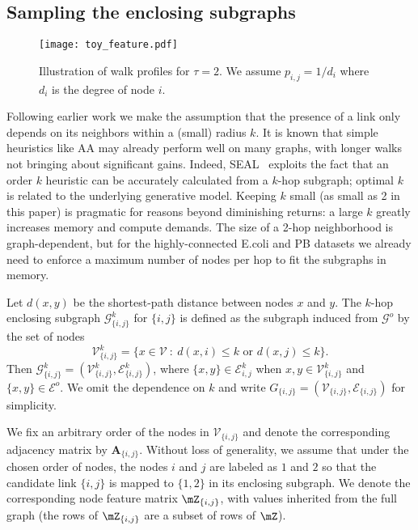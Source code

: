 \documentclass[11pt]{article}
\begin{document}
\vspace{-2mm}
\subsection{Sampling the enclosing subgraphs}
\begin{wrapfigure}{l}{0.6\textwidth} 
\centering
\vspace{-4mm}
\texttt{[image: toy\_feature.pdf]}
\caption{Illustration of walk profiles for $\tau=2$. We assume $p_{i,j}=1/d_i$ where $d_i$ is the degree of node $i$.}
\label{fig:features}
\end{wrapfigure}
Following earlier work we make the assumption that the presence of a link only depends on its neighbors within a (small) radius $k$. It is known that simple heuristics like AA may already perform well on many graphs, with longer walks not bringing about significant gains. Indeed, SEAL~\citep{zhang2018link} exploits the fact that an order $k$ heuristic can be accurately calculated from a $k$-hop subgraph; optimal $k$ is related to the underlying generative model. Keeping $k$ small (as small as 2 in this paper) is pragmatic for reasons beyond diminishing returns: a large $k$ greatly increases memory and compute demands. The size of a 2-hop neighborhood is graph-dependent, but for the highly-connected E.coli and PB datasets we already need to enforce a maximum number of nodes per hop to fit the subgraphs in memory.

Let $d(x,y)$ be the shortest-path distance between nodes $x$ and $y$. The $k$-hop enclosing subgraph $\mathcal{G}^k_{\{i,j\}}$ for $\{i,j\}$ is defined as the subgraph induced from $\mathcal{G}^o$ by the set of nodes 
\vspace{-1mm}
$$
    \mathcal{V}^k_{\{i,j\}}=\{x\in \mathcal{V} \ : \ d(x,i) \leq k \text{ or } d(x,j) \leq k \}.
$$
\vspace{-1mm}
Then $\mathcal{G}^k_{\{i,j\}}=(\mathcal{V}^k_{\{i,j\}},\mathcal{E}^k_{\{i,j\}})$, where $\{x,y\}\in \mathcal{E}^k_{i,j}$ when $x,y \in \mathcal{V}^k_{\{i,j\}}$ and $\{ x ,y \} \in \mathcal{E}^o$. We omit the dependence on $k$ and write $G_{\{i,j\}}=(\mathcal{V}_{\{i,j\}},\mathcal{E}_{\{i,j\}})$ for simplicity.

We fix an arbitrary order of the nodes in $\mathcal{V}_{\{i,j\}}$ and denote the corresponding adjacency matrix by $\mathbf{A}_{\{i,j\}}$. Without loss of generality, we assume that under the chosen order of nodes, the nodes $i$ and $j$ are labeled as $1$ and $2$ so that the candidate link $\{i,j\}$ is mapped to $\{1,2\}$ in its enclosing subgraph. We denote the corresponding node feature matrix $\mZ_{\{i,j\}}$, with values inherited from the full graph (the rows of $\mZ_{\{i,j\}}$ are a subset of rows of $\mZ$). 
\end{document}
